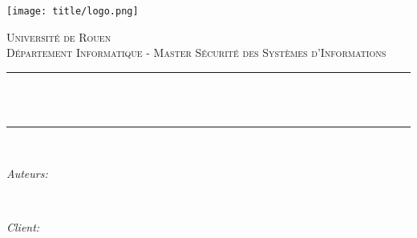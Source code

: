\begin{titlepage}

\thispagestyle{empty}
\setcounter{page}{0}
\newcommand{\HRule}{\rule{\linewidth}{0.5mm}} %


\texttt{[image: title/logo.png]}\\[1cm] %
 

\center %


\textsc{\Large Université de Rouen}\\[0.5cm] %
\textsc{\large Département Informatique - Master Sécurité des Systèmes d'Informations}\\[0.5cm] %

\makeatletter
\HRule \\[0.4cm]
{ \huge \bfseries \@title}\\[0.4cm] %
\HRule \\[1.5cm]
 

\begin{minipage}{0.4\textwidth}
\begin{flushleft} \large
\emph{Auteurs:}\\
\@author %
\end{flushleft}
\end{minipage}
~
\begin{minipage}{0.4\textwidth}
\begin{flushright} \large
\emph{Client:} \\
\client %
\end{flushright}
\end{minipage}\\[6cm]
\makeatother


\end{titlepage}
